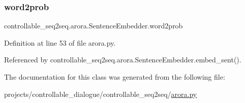 \mbox{\label{classcontrollable__seq2seq_1_1arora_1_1SentenceEmbedder_a3a0e8a0333cc523bc57aa8f2f6187a5c}} 
\subsubsection{\texorpdfstring{word2prob}{word2prob}}
{\footnotesize\ttfamily controllable\+\_\+seq2seq.\+arora.\+Sentence\+Embedder.\+word2prob}



Definition at line 53 of file arora.\+py.



Referenced by controllable\+\_\+seq2seq.\+arora.\+Sentence\+Embedder.\+embed\+\_\+sent().



The documentation for this class was generated from the following file\+:\begin{DoxyCompactItemize}
\item 
projects/controllable\+\_\+dialogue/controllable\+\_\+seq2seq/\hyperlink{arora_8py}{arora.\+py}\end{DoxyCompactItemize}
